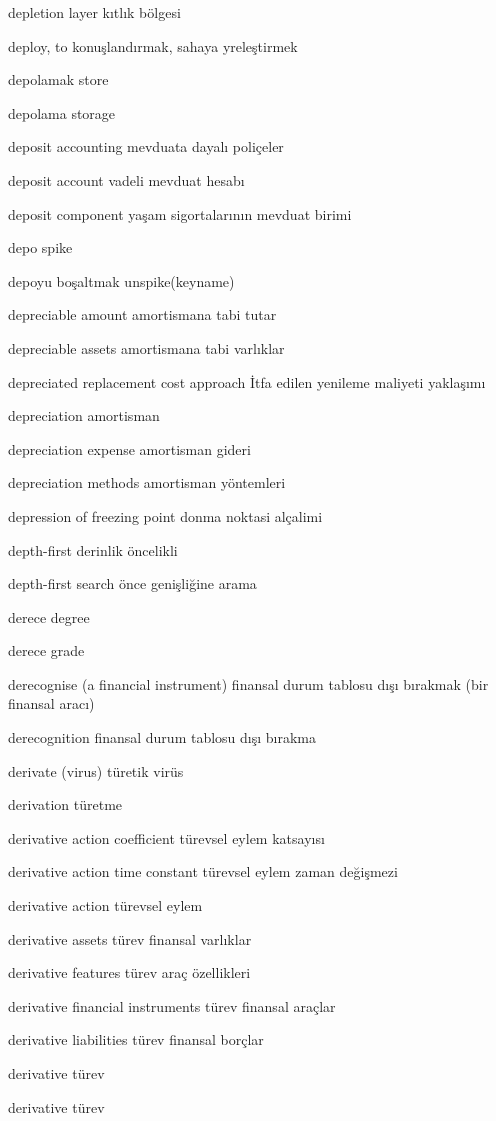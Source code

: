 \documentclass[12pt,fleqn]{article}\usepackage{../../common}
\begin{document}
depletion layer kıtlık bölgesi

deploy, to konuşlandırmak, sahaya yreleştirmek

depolamak store

depolama storage

deposit accounting mevduata dayalı poliçeler

deposit account vadeli mevduat hesabı

deposit component yaşam sigortalarının mevduat birimi

depo spike

depoyu boşaltmak unspike(keyname)

depreciable amount amortismana tabi tutar

depreciable assets amortismana tabi varlıklar

depreciated replacement cost approach İtfa edilen yenileme maliyeti yaklaşımı

depreciation amortisman

depreciation expense amortisman gideri

depreciation methods amortisman yöntemleri

depression of freezing point donma noktasi alçalimi

depth-first derinlik öncelikli

depth-first search önce genişliğine arama

derece degree

derece grade

derecognise (a financial instrument) finansal durum tablosu dışı bırakmak (bir finansal aracı)

derecognition finansal durum tablosu dışı bırakma

derivate (virus) türetik virüs

derivation türetme

derivative action coefficient türevsel eylem katsayısı

derivative action time constant türevsel eylem zaman değişmezi

derivative action türevsel eylem

derivative assets türev finansal varlıklar

derivative features türev araç özellikleri

derivative financial instruments türev finansal araçlar

derivative liabilities türev finansal borçlar

derivative türev

derivative türev
\end{document}
